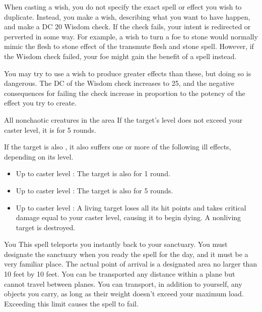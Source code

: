 \par When casting a wish, you do not specify the exact spell or effect you wish to duplicate. Instead, you make a wish, describing what you want to have happen, and make a DC 20 Wisdom check. If the check fails, your intent is redirected or perverted in some way. For example, a wish to turn a foe to stone would normally mimic the flesh to stone effect of the transmute flesh and stone spell. However, if the Wisdom check failed, your foe might gain the benefit of a  spell instead.
\par You may try to use a wish to produce greater effects than these, but doing so is dangerous. The DC of the Wisdom check increases to 25, and the negative consequences for failing the check increase in proportion to the potency of the effect you try to create.

\begin{spelltargets}{All nonchaotic creatures in the area}
    \spelleffect If the target's level does not exceed your caster level, it is \bewildered for 5 rounds.

    If the target is also \bloodied, it also suffers one or more of the following ill effects, depending on its level.
    \begin{itemize}
        \item Up to caster level : The target is also \confused for 1 round.
        \item Up to caster level : The target is also \paralyzed for 5 rounds.
        \item Up to caster level : A living target loses all its hit points and takes critical damage equal to your caster level, causing it to begin dying. A nonliving target is destroyed.
    \end{itemize}
\end{spelltargets}

\begin{spelltarget}{You}
    \spelleffect This spell teleports you instantly back to your sanctuary. You must designate the sanctuary when you ready the spell for the day, and it must be a very familiar place. The actual point of arrival is a designated area no larger than 10 feet by 10 feet. You can be transported any distance within a plane but cannot travel between planes. You can transport, in addition to yourself, any objects you carry, as long as their weight doesn't exceed your maximum load. Exceeding this limit causes the spell to fail.
\end{spelltarget}

